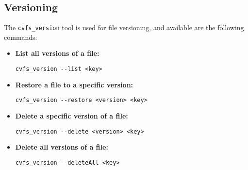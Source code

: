 \subsection*{Versioning}

The \texttt{cvfs\_version} tool is used for file versioning, and available are the following commands:

\begin{itemize}
    \setlength\itemsep{-0.1em}
    \item \textbf{List all versions of a file:} \\
    \begin{BVerbatim}[baseline=t,boxwidth=10cm]
  cvfs_version --list <key>
    \end{BVerbatim}

    \item \textbf{Restore a file to a specific version:} \\
    \begin{BVerbatim}[baseline=t,boxwidth=10cm]
  cvfs_version --restore <version> <key>
    \end{BVerbatim}

    \item \textbf{Delete a specific version of a file:} \\
    \begin{BVerbatim}[baseline=t,boxwidth=10cm]
  cvfs_version --delete <version> <key>
    \end{BVerbatim}

    \item \textbf{Delete all versions of a file:} \\
    \begin{BVerbatim}[baseline=t,boxwidth=10cm]
  cvfs_version --deleteAll <key>
    \end{BVerbatim}
\end{itemize}